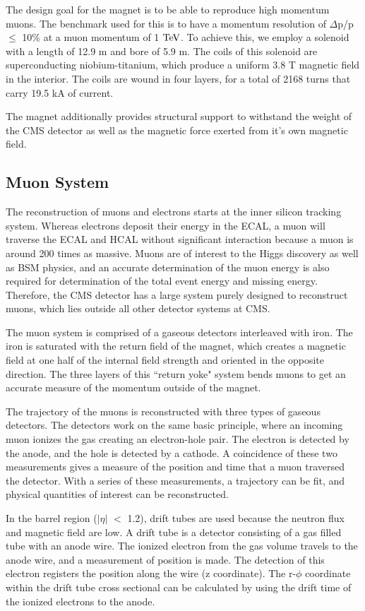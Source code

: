 The design goal for the magnet is to be able to reproduce high momentum muons.  
The benchmark used for this is to have a momentum resolution of $\Delta$p/p $\leq$ 10\% at a muon momentum of 1 $\mathrm{TeV}$.  
To achieve this, we employ a solenoid with a length of 12.9 m and bore of 5.9 m.  
The coils of this solenoid are superconducting niobium-titanium, which produce a uniform 3.8 T magnetic field in the interior. 
The coils are wound in four layers, for a total of 2168 turns that carry 19.5 kA of current.    

The magnet additionally provides structural support to withstand the weight of the CMS detector as well as the magnetic force exerted from it's own magnetic field.  

\subsection{Muon System}
The reconstruction of muons and electrons starts at the inner silicon tracking system.  
Whereas electrons deposit their energy in the ECAL, a muon will traverse the ECAL and HCAL without significant interaction because a muon is around 200 times as massive.  
Muons are of interest to the Higgs discovery as well as BSM physics, 
and an accurate determination of the muon energy is also required for determination of the total event energy and missing energy.  
Therefore, the CMS detector has a large system purely designed to reconstruct muons, which lies outside all other detector systems at CMS.  

The muon system is comprised of a gaseous detectors interleaved with iron.  
The iron is saturated with the return field of the magnet, which creates a magnetic field at one half of the internal field strength and oriented in the opposite direction.  
The three layers of this ``return yoke" system bends muons to get an accurate measure of the momentum outside of the magnet.  

The trajectory of the muons is reconstructed with three types of gaseous detectors.  
The detectors work on the same basic principle, where an incoming muon ionizes the gas creating an electron-hole pair.  
The electron is detected by the anode, and the hole is detected by a cathode.  
A coincidence of these two measurements gives a measure of the position and time that a muon traversed the detector.  
With a series of these measurements, a trajectory can be fit, and physical quantities of interest can be reconstructed.  

In the barrel region ($|\eta|$ $<$ 1.2), drift tubes are used because the neutron flux and magnetic field are low.  
A drift tube is a detector consisting of a gas filled tube with an anode wire.  
The ionized electron from the gas volume travels to the anode wire, and a measurement of position is made.  
The detection of this electron registers the position along the wire (z coordinate).  
The r-$\phi$ coordinate within the drift tube cross sectional can be calculated by using the drift time of the ionized electrons to the anode.  

